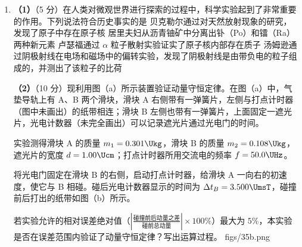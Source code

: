 \documentclass[\gkver]{gaokaozhenti}
\begin{document}
\begin{enumerate}
{（2）如图，考虑从圆形发光面边缘的 A 点发出的一条光线，假设它斜射到玻璃上表面的 A 点折射，根据折射定律有：$n\sin\theta=\sin\alpha$

式中，$n$ 是玻璃的折射率，$\theta$ 是入射角，$\alpha$ 是折射角。

现假设 A 恰好在纸片边缘，由题意，在 A 刚好发生全反射，故 $\alpha=\frac{\pi}{2}$。

设 AA' 线段在玻璃上表面的投影长为 $L$，由几何关系有：$\sin\theta=\frac{L}{\sqrt{L^{2}+h^{2}}}$

由题意纸片的半径应为 $R=L-r$

联立以上各式可得：$n=\sqrt{1+\left(\frac{h}{R-r}\right)^{2}}$。

}

\item
\textbf{（1）}（5 分）在人类对微观世界进行探索的过程中，科学实验起到了非常重要的作用。下列说法符合历史事实的是
{贝克勒尔通过对天然放射现象的研究，发现了原子中存在原子核}
{居里夫妇从沥青铀矿中分离出钋（Po）和镭（Ra）两种新元素}
{卢瑟福通过 $\alpha$ 粒子散射实验证实了原子核内部存在质子}
{汤姆逊通过阴极射线在电场和磁场中的偏转实验，发现了阴极射线是由带负电的粒子组成的，并测出了该粒子的比荷}

\textbf{（2）}（10 分）现利用图（a）所示装置验证动量守恒定律。在图（a）中，气垫导轨上有 A、B 两个滑块，滑块 A 右侧带有一弹簧片，左侧与打点计时器（图中未画出）的纸带相连；滑块 B 左侧也带有一弹簧片，上面固定一遮光片，光电计数器（未完全画出）可以记录遮光片通过光电门的时间。

实验测得滑块 A 的质量 $m_{1}=0.301\Ukg$，滑块 B 的质量 $m_{2}=0.108\Ukg$，遮光片的宽度 $d=1.00\Ucm$；打点计时器所用交流电的频率 $f=50.0\UHz$。

将光电门固定在滑块 B 的右侧，启动打点计时器，给滑块 A 一向右的初速度，使它与 B 相碰。碰后光电计数器显示的时间为 $\Delta t_{B}=3.500\UmsT$，碰撞前后打出的纸带如图（b）所示。

若实验允许的相对误差绝对值（$\left|\frac{\text{碰撞前后动量之差}}{\text{碰前总动量}}\right|\times100\%$）最大为 $5\%$，本实验是否在误差范围内验证了动量守恒定律？写出运算过程。
{figs/35b.png}
\end{enumerate}
\end{document}
